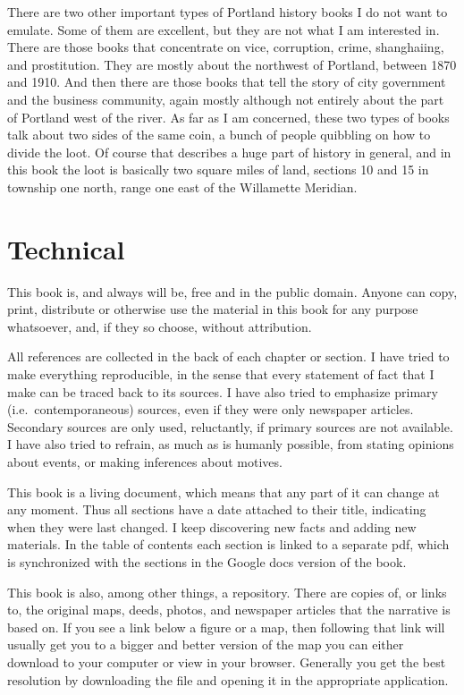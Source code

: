 \documentclass[
  12pt,
]{book}
\begin{document}
There are two other important types of Portland history books I do not want to emulate. Some of them are excellent, but they are not what I am interested in. There are those books that concentrate on vice, corruption, crime, shanghaiing, and prostitution. They are mostly about the northwest of Portland, between 1870 and 1910. And then there are those books that tell the story of city government and the business community, again mostly although not entirely about the part of Portland west of the river. As far as I am concerned, these two types of books talk about two sides of the same coin, a bunch of people quibbling on how to divide the loot. Of course that describes a huge part of history in general, and in this book the loot is basically two square miles of land, sections 10 and 15 in township one north, range one east of the Willamette Meridian.

\hypertarget{technical}{%
\section{Technical}\label{technical}}

This book is, and always will be, free and in the public domain. Anyone can copy, print, distribute or otherwise use the material in this book for any purpose whatsoever, and, if they so choose, without attribution.

All references are collected in the back of each chapter or section. I have tried to make everything reproducible, in the sense that every statement of fact that I make can be traced back to its sources. I have also tried to emphasize primary (i.e.~contemporaneous) sources, even if they were only newspaper articles. Secondary sources are only used, reluctantly, if primary sources are not available. I have also tried to refrain, as much as is humanly possible, from stating opinions about events, or making inferences about motives.

This book is a living document, which means that any part of it can change at any moment. Thus all sections have a date attached to their title, indicating when they were last changed. I keep discovering new facts and adding new materials. In the table of contents each section is linked to a separate pdf, which is synchronized with the sections in the Google docs version of the book.

This book is also, among other things, a repository. There are copies of, or links to, the original maps, deeds, photos, and newspaper articles that the narrative is based on. If you see a link below a figure or a map, then following that link will usually get you to a bigger and better version of the map you can either download to your computer or view in your browser. Generally you get the best resolution by downloading the file and opening it in the appropriate application.
\end{document}

